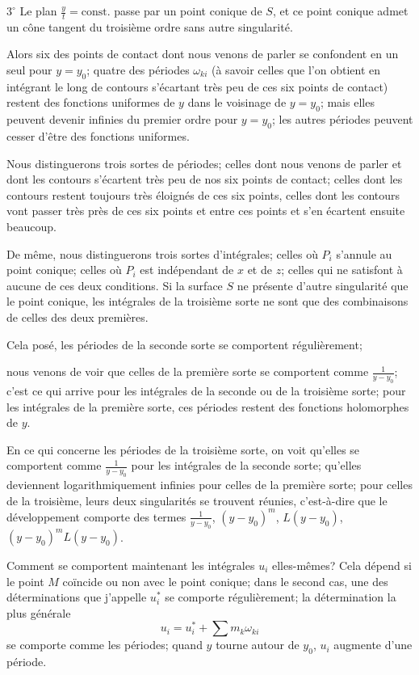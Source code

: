 \documentclass{article}
\begin{document}
$3^{\circ}$ Le plan $\frac{y}{t} = \text{const.}$ passe par un point conique de $S$, et ce point conique admet un cône tangent du troisième ordre sans autre singularité.

Alors six des points de contact dont nous venons de parler se confondent en un seul pour $y = y_{0}$; quatre des périodes $\omega_{ki}$ (à savoir celles que l'on obtient en intégrant le long de contours s'écartant très peu de ces six points de contact) restent des fonctions uniformes de $y$ dans le voisinage de $y = y_{0}$; mais elles peuvent devenir infinies du premier ordre pour $y = y_{0}$; les autres périodes peuvent cesser d'être des fonctions uniformes.

Nous distinguerons trois sortes de périodes; celles dont nous venons de parler et dont les contours s'écartent très peu de nos six points de contact; celles dont les contours restent toujours très éloignés de ces six points, celles dont les contours vont passer très près de ces six points et entre ces points et s'en écartent ensuite beaucoup.

De même, nous distinguerons trois sortes d'intégrales; celles où $P_{i}$ s'annule au point conique; celles où $P_{i}$ est indépendant de $x$ et de $z$; celles qui ne satisfont à aucune de ces deux conditions. Si la surface $S$ ne présente d'autre singularité que le point conique, les intégrales de la troisième sorte ne sont que des combinaisons de celles des deux premières.

Cela posé, les périodes de la seconde sorte se comportent régulièrement;

nous venons de voir que celles de la première sorte se comportent comme $\frac{1}{y - y_{0}}$; c'est ce qui arrive pour les intégrales de la seconde ou de la troisième sorte; pour les intégrales de la première sorte, ces périodes restent des fonctions holomorphes de $y$.

En ce qui concerne les périodes de la troisième sorte, on voit qu'elles se comportent comme $\frac{1}{y - y_{0}}$ pour les intégrales de la seconde sorte; qu'elles deviennent logarithmiquement infinies pour celles de la première sorte; pour celles de la troisième, leurs deux singularités se trouvent réunies, c'est-à-dire que le développement comporte des termes $\frac{1}{y - y_{0}}$, $(y - y_{0})^{m}$, $L(y - y_{0})$, $(y - y_{0})^{m} L(y - y_{0})$.

Comment se comportent maintenant les intégrales $u_{i}$ elles-mêmes? Cela dépend si le point $M$ coïncide ou non avec le point conique; dans le second cas, une des déterminations que j'appelle $u_{i}^{*}$ se comporte régulièrement; la détermination la plus générale
\[
u_{i} = u_{i}^{*} + \sum m_{k} \omega_{ki}
\]
se comporte comme les périodes; quand $y$ tourne autour de $y_{0}$, $u_{i}$ augmente d'une période.
\end{document}
